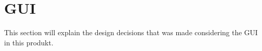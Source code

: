 \section{GUI}
This section will explain the design decisions that was made considering the GUI in this produkt.



